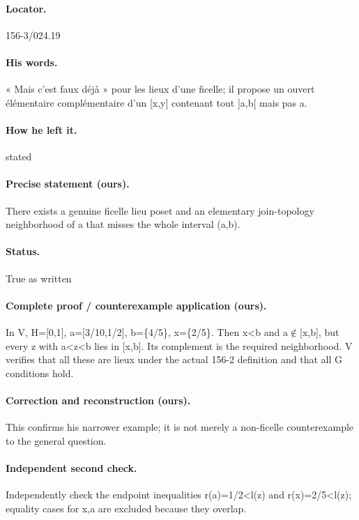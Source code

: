 \paragraph{Locator.} 156-3/024.19

\paragraph{His words.} « Mais c’est faux déjà » pour les lieux d’une ficelle; il propose un ouvert élémentaire complémentaire d’un [x,y] contenant tout ]a,b[ mais pas a.

\paragraph{How he left it.} stated

\paragraph{Precise statement (ours).} There exists a genuine ficelle lieu poset and an elementary join-topology neighborhood of a that misses the whole interval (a,b).

\paragraph{Status.} True as written

\paragraph{Complete proof / counterexample application (ours).} In V, H=[0,1], a=[3/10,1/2], b=\{4/5\}, x=\{2/5\}. Then x<b and a\ensuremath{\notin}[x,b], but every z with a<z<b lies in [x,b]. Its complement is the required neighborhood. V verifies that all these are lieux under the actual 156-2 definition and that all G conditions hold.

\paragraph{Correction and reconstruction (ours).} This confirms his narrower example; it is not merely a non-ficelle counterexample to the general question.

\paragraph{Independent second check.} Independently check the endpoint inequalities r(a)=1/2<l(z) and r(x)=2/5<l(z); equality cases for x,a are excluded because they overlap.

